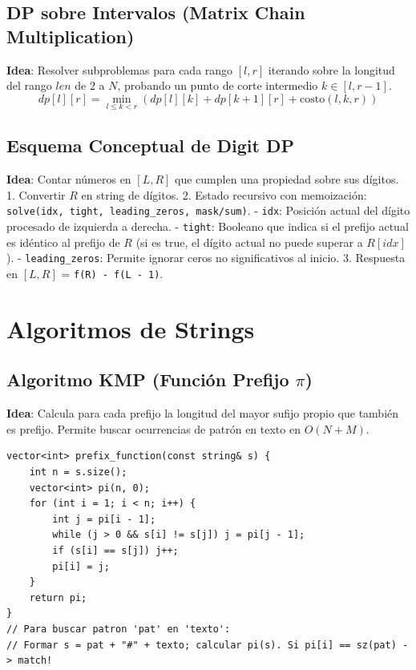 \documentclass[9pt,twocolumn,a4paper]{extarticle}
\begin{document}
\subsection{DP sobre Intervalos (Matrix Chain Multiplication)}
\textbf{Idea}: Resolver subproblemas para cada rango $[l, r]$ iterando sobre la longitud del rango $len$ de $2$ a $N$, probando un punto de corte intermedio $k \in [l, r-1]$.
$$dp[l][r] = \min_{l \le k < r} (dp[l][k] + dp[k+1][r] + \text{costo}(l, k, r))$$

\subsection{Esquema Conceptual de Digit DP}
\textbf{Idea}: Contar números en $[L, R]$ que cumplen una propiedad sobre sus dígitos.
1. Convertir $R$ en string de dígitos.
2. Estado recursivo con memoización: \texttt{solve(idx, tight, leading\_zeros, mask/sum)}.
   - \texttt{idx}: Posición actual del dígito procesado de izquierda a derecha.
   - \texttt{tight}: Booleano que indica si el prefijo actual es idéntico al prefijo de $R$ (si es true, el dígito actual no puede superar a $R[idx]$).
   - \texttt{leading\_zeros}: Permite ignorar ceros no significativos al inicio.
3. Respuesta en $[L, R]$ = \texttt{f(R) - f(L - 1)}.

\section{Algoritmos de Strings}
\subsection{Algoritmo KMP (Función Prefijo $\pi$)}
\textbf{Idea}: Calcula para cada prefijo la longitud del mayor sufijo propio que también es prefijo. Permite buscar ocurrencias de patrón en texto en $O(N + M)$.
\begin{lstlisting}
vector<int> prefix_function(const string& s) {
    int n = s.size();
    vector<int> pi(n, 0);
    for (int i = 1; i < n; i++) {
        int j = pi[i - 1];
        while (j > 0 && s[i] != s[j]) j = pi[j - 1];
        if (s[i] == s[j]) j++;
        pi[i] = j;
    }
    return pi;
}
// Para buscar patron 'pat' en 'texto':
// Formar s = pat + "#" + texto; calcular pi(s). Si pi[i] == sz(pat) -> match!
\end{lstlisting}
\end{document}
